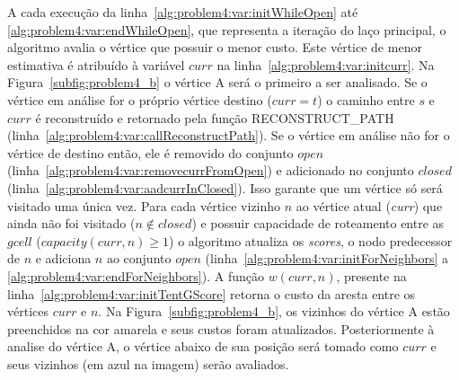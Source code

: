 A cada execução da linha~\ref{alg:problem4:var:initWhileOpen} até \ref{alg:problem4:var:endWhileOpen}, que representa a iteração do laço principal, o algoritmo avalia o vértice que possuir o menor custo.
Este vértice de menor estimativa é atribuído à variável $curr$ na linha~\ref{alg:problem4:var:initcurr}.
Na Figura~\ref{subfig:problem4_b} o vértice A será o primeiro a ser analisado.
Se o vértice em análise for o próprio vértice destino ($curr = t$) o caminho entre $s$ e $curr$ é reconstruído e retornado pela função RECONSTRUCT\_PATH (linha~\ref{alg:problem4:var:callReconstructPath}).
Se o vértice em análise não for o vértice de destino então, ele é removido do conjunto $open$ (linha~\ref{alg:problem4:var:removecurrFromOpen}) e adicionado no conjunto $closed$ (linha~\ref{alg:problem4:var:aadcurrInClosed}). Isso garante que um vértice só será visitado uma única vez.
Para cada vértice vizinho $n$ ao vértice atual (\textit{curr}) que ainda não foi visitado ($n \notin closed$) e possuir capacidade de roteamento entre as $gcell$ ($capacity(curr, n) \geq 1$) o algoritmo atualiza os \textit{scores}, o nodo predecessor de $n$ e adiciona $n$ ao conjunto $open$ (linha~\ref{alg:problem4:var:initForNeighbors} a \ref{alg:problem4:var:endForNeighbors}). A função $w(curr, n)$, presente na linha~\ref{alg:problem4:var:initTentGScore} retorna o custo da aresta entre os vértices $curr$ e $n$.
Na Figura~\ref{subfig:problem4_b}, os vizinhos do vértice A estão preenchidos na cor amarela e seus custos foram atualizados.
Posteriormente à analise do vértice A, o vértice abaixo de sua posição será tomado como $curr$ e seus vizinhos (em azul na imagem) serão avaliados.

